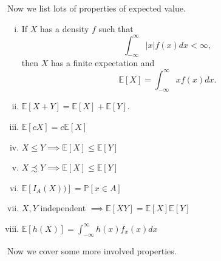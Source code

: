 \documentclass{tufte-handout}
\newcommand*\E{\mathbb{E}}
\renewcommand{\P}{\mathbb{P}}
\theoremstyle{definition}
\begin{document}
Now we list lots of properties of expected value.
\begin{enumerate}[(i)]
	\item If $X$ has a density $f$ such that \[
		\int_{-\infty}^{\infty} \left| x \right| f(x) dx < \infty 
	,\] then $X$ has a finite expectation and \[
		\E\left[X\right]  = \int_{-\infty}^{\infty} x f(x) dx 
	.\] 
	\item $\E\left[X+Y\right]  = \E\left[X\right]  + \E\left[Y\right] $.
	\item $\E\left[cX\right]  = c\E\left[X\right] $
	\item $X \le Y \implies \E\left[X\right] \le \E\left[Y\right] 	$
	\item $X \precsim Y \implies \E\left[X\right] \le \E\left[Y\right] $
	\item $\E\left[I_A(X))\right] = \P\left[x \in A\right] $
	\item $X,Y$ independent $\implies \E\left[XY\right]  = \E\left[X\right] \E\left[Y\right] $
	\item $\E\left[h(X)\right] = \int_{-\infty}^{\infty} h(x) f_x(x) dx $
\end{enumerate}

Now we cover some more involved properties.
\end{document}
